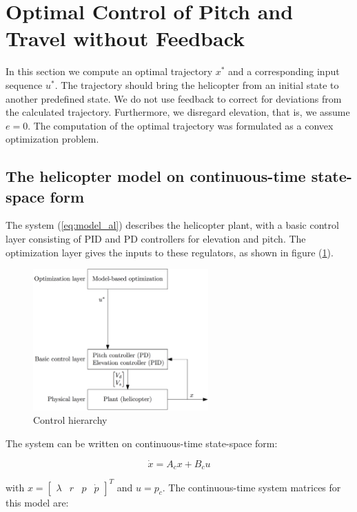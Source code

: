 \section{Optimal Control of Pitch and Travel without Feedback}\label{sec:prob2}

In this section we compute an optimal trajectory $x^*$ and a corresponding input sequence $u^*$. The trajectory should bring the helicopter from an initial state to another predefined state. We do not use feedback to correct for deviations from the calculated trajectory. Furthermore, we disregard elevation, that is, we assume $e=0$. The computation of the optimal trajectory was formulated as a convex optimization problem.

\subsection{The helicopter model on continuous-time state-space form}

The system (\ref{eq:model_al}) describes the helicopter plant, with a basic control layer consisting of PID and PD controllers for elevation and pitch. The optimization layer gives the inputs to these regulators, as shown in figure (\ref{fig:control_hierarchy}).

\begin{figure}[ht]
	\centering
	\includegraphics[width=0.6\textwidth]{figures/day2/control_hierarchy_day2}
	\caption{Control hierarchy}
	\label{fig:control_hierarchy}
\end{figure}

The system can be written on continuous-time state-space form:

\begin{equation}
    \dot{x} = A_cx + B_cu
    \label{eq:state_space_axbu}
\end{equation}

with $x = \begin{bmatrix} \lambda & r & p & \dot{p} \end{bmatrix}^T$ and $u = p_c$.
The continuous-time system matrices for this model are:

